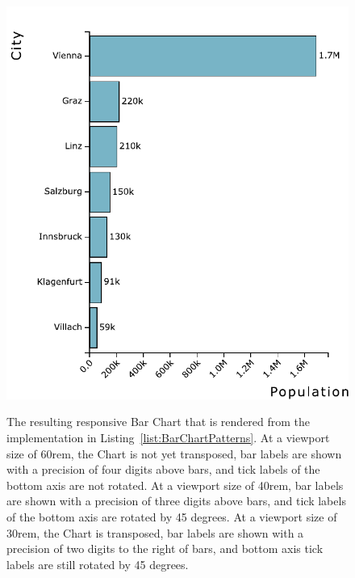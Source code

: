\begin{figure}[tp]
{  \includegraphics[valign=b,scale=\respscale]{diagrams/respvis-bar-30rem.pdf}%
  \label{fig:BarChartPatterns30rem}%
}
\caption[Responsive RespVis Bar Chart]{%
The resulting responsive Bar Chart that is rendered from the
implementation in Listing~\ref{list:BarChartPatterns}.
 At a viewport size of 60rem, the
Chart is not yet transposed, bar labels are shown with a precision of
four digits above bars, and tick labels of the bottom axis are not
rotated.   At a viewport size of
40rem, bar labels are shown with a precision of three digits above
bars, and tick labels of the bottom axis are rotated by 45 degrees.
 At a viewport size of 30rem, the
Chart is transposed, bar labels are shown with a precision of two
digits to the right of bars, and bottom axis tick labels are still
rotated by 45 degrees.
}
\label{fig:BarChartPatterns}
\end{figure}







